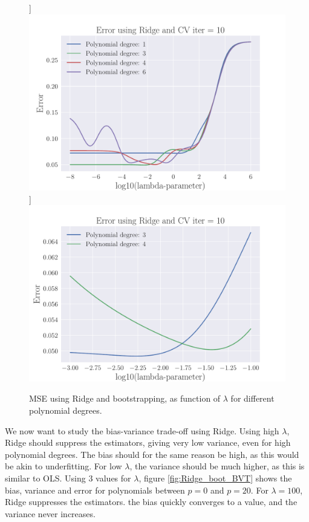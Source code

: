 \documentclass[reprint,english,notitlepage,aps,nobalancelastpage,nofootinbib]{revtex4-1}  %
\begin{document}
\begin{figure}[H]
	]
	\includegraphics[width=\linewidth]{lambdaMSE_Ridge_CV10_n30_eps02_p6_lm8_6.pdf}
	\endminipage\hfill
	]
	\includegraphics[width=\linewidth]{lambdaMSE_Ridge_CV10_n30_eps02_p4_lm3_m1.pdf}
	\endminipage
	\caption{MSE using Ridge and bootstrapping, as function of $\lambda$ for different polynomial degrees.}
	\label{fig:Ridge_CV_lambdas}
\end{figure}

We now want to study the bias-variance trade-off using Ridge. Using high $\lambda$, Ridge should suppress the estimators, giving very low variance, even for high polynomial degrees. The bias should for the same reason be high, as this would be akin to underfitting. For low $\lambda$, the variance should be much higher, as this is similar to OLS.  Using 3 values for $\lambda$, figure \ref{fig:Ridge_boot_BVT} shows the bias, variance and error for polynomials between $p=0$ and $p=20$. For $\lambda=100$, Ridge suppresses the estimators.   the bias quickly converges to a value, and the variance never increases.
\end{document}
